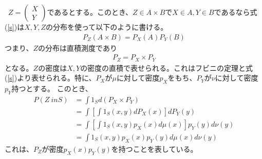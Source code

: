 \documentclass[a4j,12pt]{jarticle}
\begin{document}
\ $Z = \left(\begin{array}{c}X \\ Y\end{array} \right)$であるとする。このとき、$Z \in A × B$で$X \in A,Y \in B$であるなら式(\ref{s})は$X,Y,Z$の分布を使って以下のように書ける。
\begin{align*}
P_{Z}(A × B) = P_{X}(A)P_{Y}(B)
\end{align*}
つまり、$Z$の分布は直積測度であり
\begin{align*}
P_{Z} = P_{X} × P_{Y}
\end{align*}
となる。$Z$の密度は$X,Y$の密度の直積で表せられる。これはフビニの定理と式(\ref{s})より表せられる。特に、$P_{X}$が$\mu$に対して密度$p_{X}$をもち、$P_{Y}$が$\nu$に対して密度$p_{Y}$持つとする。
このとき、
\begin{align*}
P(Z\ in S) &= \int 1_{S}d(P_{X}×P_{Y}) \\
& = \int \left[\int  1_{S}(x,y)dP_{X}(x)\right]dP_{Y}(y) \\
& = \int \left[\int  1_{S}(x,y)p_{X}(x)d\mu(x)\right]p_{Y}(y)d\nu(y) \\
& = \int 1_{S}(x,y)p_{X}(x)p_{Y}(y)d\mu(x) d\nu(y)
\end{align*}
これは、$P_{Z}$が密度$p_{X}(x)p_{Y}(y)$を持つことを表している。
\end{document}
